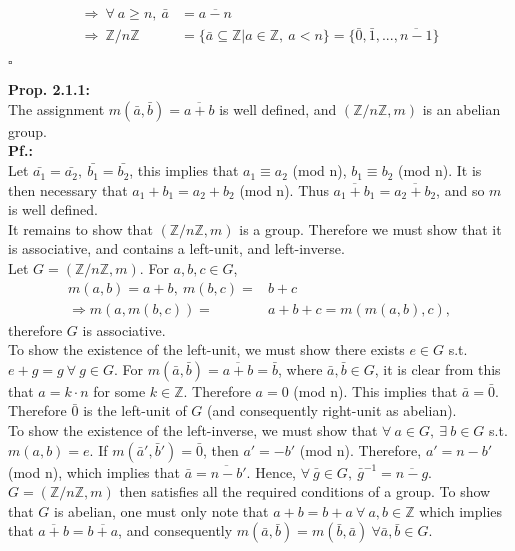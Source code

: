 \documentclass{article}
\begin{document}
\begin{align*}
\Rightarrow ~ \forall ~ a\geq n, ~ \bar{a}&=\overline{a-n}\\
\Rightarrow  ~ \mathbb{Z}/n\mathbb{Z}&=\lbrace \bar{a}\subseteq \mathbb{Z}|a\in \mathbb{Z}, ~ a<n\rbrace=\lbrace \bar{0}, \bar{1}, ..., \overline{n-1}\rbrace
\end{align*}
\begin{flushright}
$\square$
\end{flushright} 
\textbf{Prop. 2.1.1:}\\
The assignment $m(\bar{a},\bar{b})=\overline{a+b}$ is well defined, and $(\mathbb{Z}/n\mathbb{Z},m) $ is an abelian group.\\
\textbf{Pf.:}\\
Let $\bar{a_1}=\bar{a_2},~\bar{b_1}=\bar{b_2}$, this implies that $a_1\equiv a_2 $ (mod n), $b_1\equiv b_2$ (mod n). It is then necessary that $a_1+b_1=a_2+b_2$ (mod n). Thus $\overline{a_1+b_1}=\overline{a_2+b_2}$, and so $m$ is well defined.\\
\indent It remains to show that $(\mathbb{Z}/n\mathbb{Z},m)$ is a group. Therefore we must show that it is associative, and contains a left-unit, and left-inverse.\\
\indent Let $G=(\mathbb{Z}/n\mathbb{Z},m)$. For $a,b,c\in G$,
\begin{align*}
m(a,b)=a+b, ~m(b,c)=&b+c\\
\Rightarrow m(a,m(b,c))=&a+b+c=m(m(a,b),c),
\end{align*}
 therefore $G$ is associative. \\ \indent To show the existence of the left-unit, we must show there exists $e\in G$ s.t. $e+g=g~\forall~g\in G$. For $m(\bar{a},\bar{b})=\overline{a+b}=\bar{b}$, where $\bar{a},\bar{b}\in G$, it is clear from this that $a=k\cdot n$ for some $k\in \mathbb{Z}$. Therefore $a=0$ (mod n). This implies that $\bar{a}=\bar{0}$. Therefore $\bar{0}$ is the left-unit of $G$ (and consequently right-unit as abelian).\\
 \indent To show the existence of the left-inverse, we must show that $\forall~a\in G, ~\exists ~ b\in G$ s.t. $m(a,b)=e$. If $m(\bar{a}',\bar{b}')=\bar{0}$, then $a'=-b'$ (mod n). Therefore, $a'=n-b'$ (mod n), which implies that $\bar{a}=\overline{n-b}'$. Hence, $\forall~\bar{g}\in G, ~\bar{g}^{-1}=\overline{n-g}$.\\
 \indent $G=(\mathbb{Z}/n\mathbb{Z},m) $ then satisfies all the required conditions of a  group. To show that $G$ is abelian, one must only note that $a+b=b+a~\forall ~ a,b\in \mathbb{Z}$ which implies that $\overline{a+b}=\overline{b+a}$, and consequently $m(\bar{a},\bar{b})=m(\bar{b},\bar{a})~\forall \bar{a},\bar{b}\in G$.\\
\end{document}
